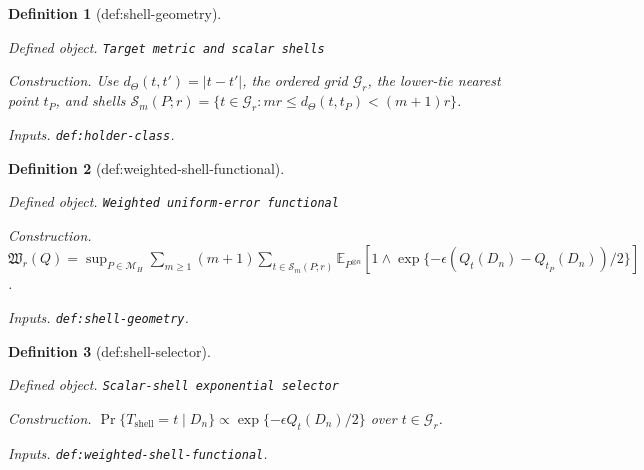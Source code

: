 \documentclass{article}
\newtheorem{definition}{Definition}
\begin{document}
\begin{definition}[def:shell-geometry]\label{def:shell-geometry}
\par\smallskip\noindent\emph{Defined object.} \texttt{Target metric and scalar shells}
\par\smallskip\noindent\emph{Construction.} Use \(d_\Theta(t,t')=|t-t'|\), the ordered grid \(\mathcal G_r\), the lower-tie nearest point \(t_P\), and shells \(\mathcal S_m(P;r)=\{t\in\mathcal G_r:mr\le d_\Theta(t,t_P)<(m+1)r\}\).
\par\smallskip\noindent\emph{Inputs.} \texttt{def:\allowbreak{}holder-\allowbreak{}class}.
\end{definition}

\begin{definition}[def:weighted-shell-functional]\label{def:weighted-shell-functional}
\par\smallskip\noindent\emph{Defined object.} \texttt{Weighted uniform-\allowbreak{}error functional}
\par\smallskip\noindent\emph{Construction.} \(\mathfrak W_r(Q)=\sup_{P\in\mathcal M_H}\sum_{m\ge1}(m+1)\sum_{t\in\mathcal S_m(P;r)}\mathbb E_{P^{\otimes n}}[1\wedge\exp\{-\epsilon(Q_t(D_n)-Q_{t_P}(D_n))/2\}]\).
\par\smallskip\noindent\emph{Inputs.} \texttt{def:\allowbreak{}shell-\allowbreak{}geometry}.
\end{definition}

\begin{definition}[def:shell-selector]\label{def:shell-selector}
\par\smallskip\noindent\emph{Defined object.} \texttt{Scalar-\allowbreak{}shell exponential selector}
\par\smallskip\noindent\emph{Construction.} \(\Pr\{T_{\mathrm{shell}}=t\mid D_n\}\propto\exp\{-\epsilon Q_t(D_n)/2\}\) over \(t\in\mathcal G_r\).
\par\smallskip\noindent\emph{Inputs.} \texttt{def:\allowbreak{}weighted-\allowbreak{}shell-\allowbreak{}functional}.
\end{definition}
\end{document}
